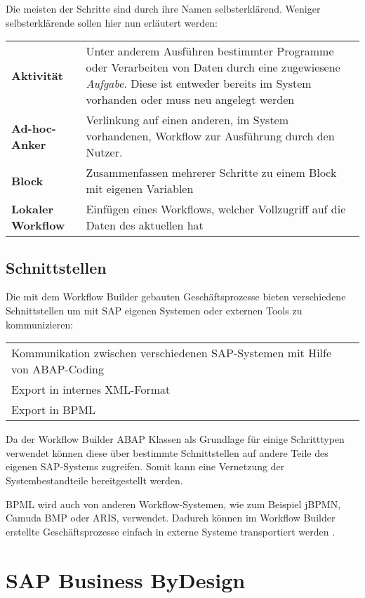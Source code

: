 \documentclass{handout}
\begin{document}
Die meisten der Schritte sind durch ihre Namen selbsterklärend. Weniger selbsterklärende sollen hier nun erläutert werden:

\small
\begin{tabular}{l p{13 cm}}
\textbf{Aktivität} & Unter anderem Ausführen bestimmter Programme oder Verarbeiten von Daten durch eine zugewiesene \textit{Aufgabe}. Diese ist entweder bereits im System vorhanden oder muss neu angelegt werden\\
\textbf{Ad-hoc-Anker} & Verlinkung auf einen anderen, im System vorhandenen, Workflow zur Ausführung durch den Nutzer.\\
\textbf{Block} & Zusammenfassen mehrerer Schritte zu einem Block mit eigenen Variablen\\
\textbf{Lokaler Workflow} & Einfügen eines Workflows, welcher Vollzugriff auf die Daten des aktuellen hat\\
\end{tabular}
\normalsize

\subsection{Schnittstellen}

Die mit dem Workflow Builder gebauten Geschäftsprozesse bieten verschiedene Schnittstellen um mit SAP eigenen Systemen oder externen Tools zu kommunizieren:

\small
\begin{tabular}{L l}
Kommunikation zwischen verschiedenen SAP-Systemen mit Hilfe von ABAP-Coding\\
Export in internes XML-Format\\
Export in BPML\\
\end{tabular}
\normalsize

Da der Workflow Builder ABAP Klassen als Grundlage für einige Schritttypen verwendet können diese über bestimmte Schnittstellen auf andere Teile des eigenen SAP-Systems zugreifen. Somit kann eine Vernetzung der Systembestandteile bereitgestellt werden.

BPML wird auch von anderen Workflow-Systemen, wie zum Beispiel jBPMN, Camuda BMP oder ARIS, verwendet. Dadurch können im Workflow Builder erstellte Geschäftsprozesse einfach in externe Systeme transportiert werden \cite{BPML}.

\section{SAP Business ByDesign}
\end{document}
